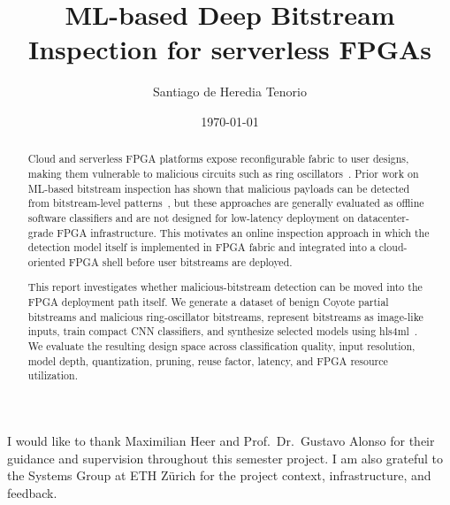 \documentclass[a4paper, oneside]{discothesis}
\title{ML-based Deep Bitstream Inspection for
serverless FPGAs}
\author{Santiago de Heredia Tenorio}
\institute{Systems Group \\[2pt]
ETH Zürich}
\date{\today}
\begin{document}
\frontmatter %
\maketitle

\cleardoublepage

\begin{acknowledgements}
I would like to thank Maximilian Heer and Prof.\ Dr.\ Gustavo Alonso for their guidance and supervision throughout this semester project. I am also grateful to the Systems Group at ETH Zürich for the project context, infrastructure, and feedback.
\end{acknowledgements}


\begin{abstract}
Cloud and serverless FPGA platforms expose reconfigurable fabric to user designs, making them vulnerable to malicious circuits such as ring oscillators~\cite{gnad2017voltage,la2021denial,provelengios2020power}. Prior work on ML-based bitstream inspection has shown that malicious payloads can be detected from bitstream-level patterns~\cite{rettkowski2019inspection,chaudhuri2022detection,elnaggar2023learning,palumbo2022trojan}, but these approaches are generally evaluated as offline software classifiers and are not designed for low-latency deployment on datacenter-grade FPGA infrastructure. This motivates an online inspection approach in which the detection model itself is implemented in FPGA fabric and integrated into a cloud-oriented FPGA shell before user bitstreams are deployed.

This report investigates whether malicious-bitstream detection can be moved into the FPGA deployment path itself. We generate a dataset of benign Coyote partial bitstreams and malicious ring-oscillator bitstreams, represent bitstreams as image-like inputs, train compact CNN classifiers, and synthesize selected models using hls4ml~\cite{duarte2018fast,aarrestad2021fast}. We evaluate the resulting design space across classification quality, input resolution, model depth, quantization, pruning, reuse factor, latency, and FPGA resource utilization.


\end{abstract}
\end{document}
